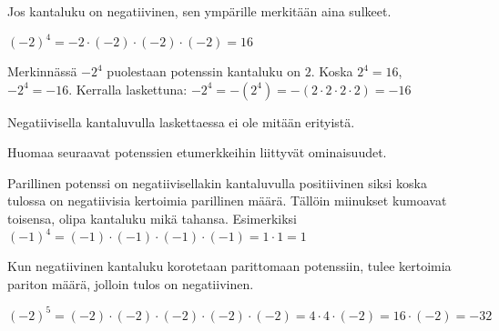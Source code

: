 Jos kantaluku on negatiivinen, sen ympärille merkitään aina sulkeet.

\begin{esimerkki}
$(-2)^4 = -2 \cdot (-2)\cdot(-2)\cdot(-2) = 16$

Merkinnässä $-2^4$ puolestaan potenssin kantaluku on $2$. Koska $2^4 = 16$,
$-2^4=-16$. Kerralla laskettuna: $-2^4 =-(2^4)= -(2 \cdot 2\cdot 2 \cdot 2) = -16$
\end{esimerkki}

Negatiivisella kantaluvulla laskettaessa ei ole mitään erityistä.
 
    \begin{esimerkki}

    \end{esimerkki}
    
Huomaa seuraavat potenssien etumerkkeihin liittyvät ominaisuudet.


Parillinen potenssi on negatiivisellakin kantaluvulla positiivinen siksi koska tulossa on negatiivisia kertoimia parillinen määrä. Tällöin miinukset kumoavat toisensa, olipa kantaluku mikä tahansa.  Esimerkiksi $(-1)^4=(-1) \cdot (-1) \cdot (-1) \cdot (-1)= 1\cdot 1=1$

Kun negatiivinen kantaluku korotetaan parittomaan potenssiin, tulee kertoimia pariton määrä, jolloin tulos on negatiivinen.
\begin{esimerkki}

$(-2)^5=(-2) \cdot (-2) \cdot (-2) \cdot (-2) \cdot (-2)=4\cdot4\cdot(-2)=16\cdot(-2)= -32$
\end{esimerkki}

